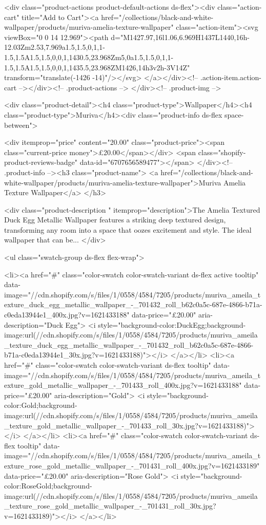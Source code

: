 {{{{{{{<div class="product-actions product-default-actions ds-flex"><div class="action-cart" title="Add to Cart"><a href="/collections/black-and-white-wallpaper/products/muriva-amelia-texture-wallpaper" class="action-item"><svg viewBox="0 0 14 12.969"><path d="M1427.97,16l1.06,6.969H1437L1440,16h-12.03Zm2.53,7.969a1.5,1.5,0,1,1-1.5,1.5A1.5,1.5,0,0,1,1430.5,23.968Zm5,0a1.5,1.5,0,1,1-1.5,1.5A1.5,1.5,0,0,1,1435.5,23.968ZM1426,14h3v2h-3V14Z" transform="translate(-1426 -14)"/></svg>
</a></div><!-- .action-item.action-cart --></div><!-- .product-actions -->
</div><!-- .product-img -->

<div class="product-detail"><h4 class="product-type">Wallpaper</h4><h4 class="product-type">Muriva</h4><div class="product-info ds-flex space-between">
    
<div itemprop="price" content="20.00" class="product-price"><span class="current-price money">£20.00</span></div>
    <span class="shopify-product-reviews-badge" data-id="6707656589477"></span>
  </div><!-- .product-info --><h3 class="product-name">
      <a href="/collections/black-and-white-wallpaper/products/muriva-amelia-texture-wallpaper">Muriva Amelia Texture Wallpaper</a>
    </h3>
    
<div class="product-description " itemprop="description">The Amelia Textured Duck Egg Metallic Wallpaper features a striking deep textured design, transforming any room into a space that oozes excitement and style. The ideal wallpaper that can be...
</div>



<ul class="swatch-group ds-flex flex-wrap">
        
<li><a href="#" class="color-swatch color-swatch-variant ds-flex active tooltip" data-image="//cdn.shopify.com/s/files/1/0558/4584/7205/products/muriva_ameila_texture_duck_egg_metallic_wallpaper_-_701432_roll_b62c0a5c-687e-4866-b71a-c0eda13944e1_400x.jpg?v=1621433188" data-price="£20.00" aria-description="Duck Egg">
              <i style="background-color:DuckEgg;background-image:url(//cdn.shopify.com/s/files/1/0558/4584/7205/products/muriva_ameila_texture_duck_egg_metallic_wallpaper_-_701432_roll_b62c0a5c-687e-4866-b71a-c0eda13944e1_30x.jpg?v=1621433188)"></i>
            </a></li>
<li><a href="#" class="color-swatch color-swatch-variant ds-flex tooltip" data-image="//cdn.shopify.com/s/files/1/0558/4584/7205/products/muriva_ameila_texture_gold_metallic_wallpaper_-_701433_roll_400x.jpg?v=1621433188" data-price="£20.00" aria-description="Gold">
              <i style="background-color:Gold;background-image:url(//cdn.shopify.com/s/files/1/0558/4584/7205/products/muriva_ameila_texture_gold_metallic_wallpaper_-_701433_roll_30x.jpg?v=1621433188)"></i>
            </a></li>
<li><a href="#" class="color-swatch color-swatch-variant ds-flex tooltip" data-image="//cdn.shopify.com/s/files/1/0558/4584/7205/products/muriva_ameila_texture_rose_gold_metallic_wallpaper_-_701431_roll_400x.jpg?v=1621433189" data-price="£20.00" aria-description="Rose Gold">
              <i style="background-color:RoseGold;background-image:url(//cdn.shopify.com/s/files/1/0558/4584/7205/products/muriva_ameila_texture_rose_gold_metallic_wallpaper_-_701431_roll_30x.jpg?v=1621433189)"></i>
            </a></li>

}}}}}}}
